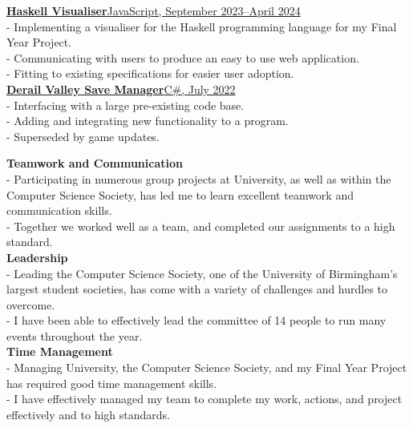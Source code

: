 \documentclass[twoside]{article}
\begin{document}
\href{https://github.com/FrozenDude101/masters-project}{\textbf{Haskell Visualiser}\hfill JavaScript, September 2023--April 2024}\\
- Implementing a visualiser for the Haskell programming language for my Final Year Project.\\
- Communicating with users to produce an easy to use web application.\\
- Fitting to existing specifications for easier user adoption.\vspace{2pt}\\
\href{https://github.com/FrozenDude101/DV-SaveManager}{\textbf{Derail Valley Save Manager}\hfill C\#, July 2022}\\
- Interfacing with a large pre-existing code base.\\
- Adding and integrating new functionality to a program.\\
- Superseded by game updates.

\textbf{Teamwork and Communication}\\
- Participating in numerous group projects at University, as well as within the Computer Science Society, has led me to learn excellent teamwork and communication skills.\\
- Together we worked well as a team, and completed our assignments to a high standard.\vspace{2pt}\\
\textbf{Leadership}\\
- Leading the Computer Science Society, one of the University of Birmingham's largest student societies, has come with a variety of challenges and hurdles to overcome.\\
- I have been able to effectively lead the committee of 14 people to run many events throughout the year.\vspace{2pt}\\
\textbf{Time Management}\\
- Managing University, the Computer Science Society, and my Final Year Project has required good time management skills.\\
- I have effectively managed my team to complete my work, actions, and project effectively and to high standards.\vspace{2pt}\\
\end{document}
